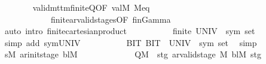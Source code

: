 \begin{isabellebody}
\ \ \ \ \ \ \isamarkupfalse%
\ valid{\isacharunderscore}{\kern0pt}mttm{\isacharunderscore}{\kern0pt}finite{\isacharunderscore}{\kern0pt}Q{\isacharbrackleft}{\kern0pt}OF\ valM{\isacharbrackright}{\kern0pt}\ M{\isacharunderscore}{\kern0pt}eq\isanewline
\ \ \ \ \ \ \ \ \ \ \ \ finite{\isacharunderscore}{\kern0pt}ar{\isacharunderscore}{\kern0pt}valid{\isacharunderscore}{\kern0pt}stages{\isacharbrackleft}{\kern0pt}OF\ fin{\isacharunderscore}{\kern0pt}Gamma{\isacharbrackright}{\kern0pt}\isanewline
\ \ \ \ \ \ \isamarkupfalse%
\ {\isacharparenleft}{\kern0pt}auto\ intro{\isacharcolon}{\kern0pt}\ finite{\isacharunderscore}{\kern0pt}cartesian{\isacharunderscore}{\kern0pt}product{\isacharparenright}{\kern0pt}\isanewline
\isanewline
\ \ \ \ %
\isanewline
\ \ \ \ \isamarkupfalse%
\ {\isachardoublequoteopen}finite\ {\isacharparenleft}{\kern0pt}UNIV\ {\isacharcolon}{\kern0pt}{\isacharcolon}{\kern0pt}\ sym{}\ set{\isacharparenright}{\kern0pt}{\isachardoublequoteclose}\ \isamarkupfalse%
\ {\isacharparenleft}{\kern0pt}simp\ add{\isacharcolon}{\kern0pt}\ sym{}{\isacharunderscore}{\kern0pt}UNIV{\isacharparenright}{\kern0pt}\isanewline
\isanewline
\ \ \ \ %
\isanewline
\ \ \ \ \isamarkupfalse%
\ {\isachardoublequoteopen}{\isacharbraceleft}{\kern0pt}BIT{}{\isacharcomma}{\kern0pt}\ BIT{}{\isacharbraceright}{\kern0pt}\ {\isasymsubseteq}\ {\isacharparenleft}{\kern0pt}UNIV\ {\isacharcolon}{\kern0pt}{\isacharcolon}{\kern0pt}\ sym{}\ set{\isacharparenright}{\kern0pt}{\isachardoublequoteclose}\ \isamarkupfalse%
\ simp\isanewline
\isanewline
\ \ \ \ %
\isanewline
\ \ \ \ \isamarkupfalse%
\ {\isachardoublequoteopen}{\isacharparenleft}{\kern0pt}s\isactrlsub M{\isacharcomma}{\kern0pt}\ ar{\isacharunderscore}{\kern0pt}init{\isacharunderscore}{\kern0pt}stage\ bl\isactrlsub M{\isacharparenright}{\kern0pt}\isanewline
\ \ \ \ \ \ \ \ \ \ \ \ {\isasymin}\ Q\isactrlsub M\ {\isasymtimes}\ {\isacharbraceleft}{\kern0pt}stg{\isachardot}{\kern0pt}\ ar{\isacharunderscore}{\kern0pt}valid{\isacharunderscore}{\kern0pt}stage\ {\isasymGamma}\isactrlsub M\ bl\isactrlsub M\ stg\isanewline

\end{isabellebody}
